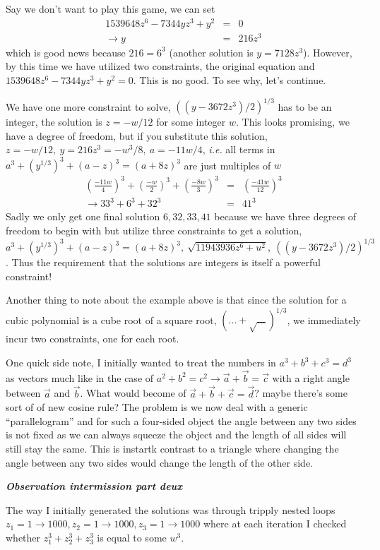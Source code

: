 \documentclass[aps,preprint,preprintnumbers,nofootinbib,showpacs,prd]{revtex4-1}
\newcommand{\ie}{{\it i.e.} }
\newcommand{\nbea}{\begin{eqnarray*}}
\newcommand{\neea}{\end{eqnarray*}}
\begin{document}
Say we don't want to play this game, we can set
%
\nbea
1539648z^6-7344yz^3+y^2 & = & 0 \\
\rightarrow y & = & 216 z^3
\neea
%
which is good news because $216 = 6^3$ (another solution is $y = 7128 z^3$). However, by this time we have utilized two constraints, the original equation and $1539648z^6-7344yz^3+y^2 = 0$. This is no good. To see why, let's continue. 

We have one more constraint to solve, $((y-3672z^3)/2)^{1/3}$ has to be an integer, the solution is $z = -w/12$ for some integer $w$. This looks promising, we have a degree of freedom, but if you substitute this solution, $z = -w/12, ~ y = 216 z^3 = -w^3/8, ~ a = -11w/4$, \ie all terms in $a^3 + (y^{1/3})^3 + (a-z)^3 = (a + 8z)^3$ are just multiples of $w$
%
\nbea
\left ( \frac{-11 w}{4} \right )^3 + \left ( \frac{- w}{2} \right )^3 + \left ( \frac{-8 w}{3} \right )^3 & = & \left ( \frac{-41 w}{12} \right )^3 \\
\rightarrow 33^3 + 6^3 + 32^3 & = & 41^3
\neea
%
Sadly we only get one final solution $6,32,33,41$ because we have three degrees of freedom to begin with but utilize three constraints to get a solution, $a^3 + (y^{1/3})^3 + (a-z)^3 = (a + 8z)^3, ~\sqrt{11943936z^6+u^2}, ~((y-3672z^3)/2)^{1/3}$. Thus the requirement that the solutions are integers is itself a powerful constraint!

Another thing to note about the example above is that since the solution for a cubic polynomial is a cube root of a square root, $( \dots + \sqrt{\dots})^{1/3}$, we immediately incur two constraints, one for each root.

One quick side note, I initially wanted to treat the numbers in $a^3 + b^3 + c^3 = d^3$ as vectors much like in the case of $a^2 + b^2 = c^2 \rightarrow \vec a + \vec b = \vec c$ with a right angle between $\vec a$ and $\vec b$. What would become of $\vec a + \vec b + \vec c = \vec d$? maybe there's some sort of of new cosine rule? The problem is we now deal with a generic ``parallelogram'' and for such a four-sided object the angle between any two sides is not fixed as we can always squeeze the object and the length of all sides will still stay the same. This is instartk contrast to a triangle where changing the angle between any two sides would change the length of the other side.

\bigskip\textbf{\textit{Observation intermission part deux}}

The way I initially generated the solutions was through tripply nested loops $z_1 = 1 \to 1000, z_2 = 1 \to 1000, z_3 = 1 \to 1000$ where at each iteration I checked whether $z_1^3 + z_2^3 + z_3^3$ is equal to some $w^3$.
\end{document}
